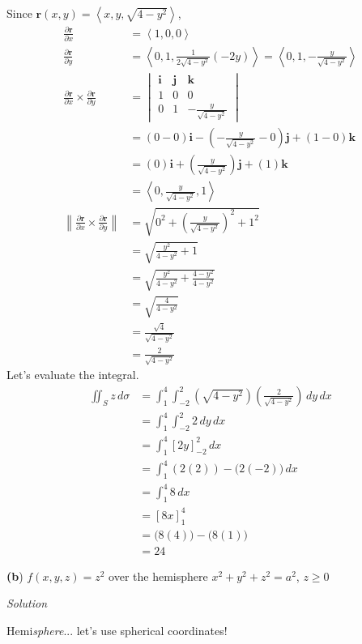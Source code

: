\documentclass{article}
\newcommand{\lrp}[1]{\left( #1 \right)}
\newcommand{\lra}[1]{\left\langle #1 \right\rangle}
\newcommand{\lrb}[1]{\left[ #1 \right]}
\newcommand{\norm}[1]{\left\lVert #1 \right\rVert}
\renewcommand{\i}[0]{\mathbf{i}}
\renewcommand{\j}[0]{\mathbf{j}}
\renewcommand{\k}[0]{\mathbf{k}}
\renewcommand{\r}[0]{\mathbf{r}}
\newcommand{\Solution}{\textit{Solution}}
\begin{document}
Since $\r(x,y)=\lra{x,y,\sqrt{4-y^2}}$,
\begin{align*}
    \frac{\partial \r}{\partial x}&=\lra{1,0,0}\\
    \frac{\partial \r}{\partial y}&=\lra{0,1,\frac{1}{2\sqrt{4-y^2}}\lrp{-2y}}=\lra{0,1,-\frac{y}{\sqrt{4-y^2}}}\\
    \frac{\partial \r}{\partial x}\times \frac{\partial \r}{\partial y}&=\begin{vmatrix}\i & \j & \k\\
    1 & 0 & 0\\
    0 & 1 & -\frac{y}{\sqrt{4-y^2}}\end{vmatrix}\\
    &=\lrp{0 - 0}\i -\lrp{-\frac{y}{\sqrt{4-y^2}}-0}\j +\lrp{1-0}\k\\
    &=\lrp{0}\i +\lrp{\frac{y}{\sqrt{4-y^2}}}\j + \lrp{1}\k\\
    &=\lra{0, \frac{y}{\sqrt{4-y^2}},1}\\
    \norm{ \frac{\partial \r}{\partial x}\times \frac{\partial \r}{\partial y}}&=\sqrt{0^2+\lrp{\frac{y}{\sqrt{4-y^2}}}^2+1^2}\\
    &=\sqrt{\frac{y^2}{4-y^2}+1}\\
    &=\sqrt{\frac{y^2}{4-y^2}+\frac{4-y^2}{4-y^2}}\\
    &=\sqrt{\frac{4}{4-y^2}}\\
    &=\frac{\sqrt{4}}{\sqrt{4-y^2}}\\
    &=\frac{2}{\sqrt{4-y^2}}
\end{align*}
Let's evaluate the integral.
\begin{align*}
  \iint_S z\,d\sigma &= \int_1^4\int_{-2}^2 \lrp{\sqrt{4-y^2}}\lrp{\frac{2}{\sqrt{4-y^2}}}\,dy\,dx\\
    &=\int_1^4\int_{-2}^2 2\,dy\,dx\\
    &=\int_1^4 \lrb{2y}_{-2}^2\,dx\\
    &=\int_1^4 \lrp{2(2)}-\big(2(-2)\big)\,dx\\
    &=\int_1^4 8\,dx\\
    &=\lrb{8x}_1^4\\
    &=\big(8(4)\big)-\big(8(1)\big)\\
    &=\boxed{24}
\end{align*}

{}\textbf{(b}) $f(x,y,z)=z^2$ over the hemisphere $x^2+y^2+z^2=a^2$, $z\geq 0$

\Solution

Hemi\textit{sphere}... let's use spherical coordinates!
\end{document}

